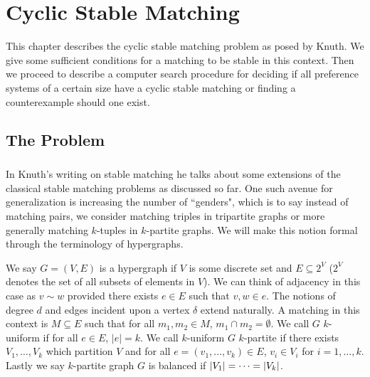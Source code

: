 \chapter{Cyclic Stable Matching}
This chapter describes the cyclic stable matching problem as posed by Knuth. We give some sufficient conditions for a matching to be stable in this context. Then we proceed to describe a computer search procedure for deciding if all preference systems of a certain size have a cyclic stable matching or finding a counterexample should one exist. 
\section{The Problem}
\paragraph{}
In Knuth's writing on stable matching \cite{knuth1997stable} he talks about some extensions of the classical stable matching problems as discussed so far. One such avenue for generalization is increasing the number of ``genders", which is to say instead of matching pairs, we consider matching triples in tripartite graphs or more generally matching $k$-tuples in $k$-partite graphs. We will make this notion formal through the terminology of hypergraphs.
\begin{definition}
We say $G=(V,E)$ is a hypergraph if $V$ is some discrete set and $E \subseteq 2^V$ ($2^V$ denotes the set of all subsets of elements in $V$). We can think of adjacency in this case as $v \sim w$ provided there exists $e \in E$ such that $v, w \in e$. The notions of degree $d$ and edges incident upon a vertex $\delta$ extend naturally. A matching in this context is $M \subseteq E$ such that for all $m_1, m_2 \in M$, $m_1 \cap m_2 = \emptyset$. We call $G$ $k$-uniform if for all $e \in E$, $|e| = k$. We call $k$-uniform $G$ $k$-partite if there exists $V_1, \dots, V_k$ which partition $V$ and for all $e=(v_1, \dots, v_k) \in E$, $v_i \in V_i$ for $i = 1,\dots, k$. Lastly we say $k$-partite graph $G$ is balanced if $\left|V_1\right| = \dots = \left|V_k\right|$.
\end{definition}
